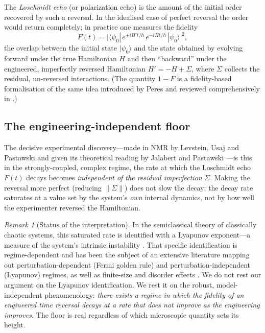 \documentclass[11pt,a4paper]{article}
\theoremstyle{thmstyle}
\theoremstyle{definition}
\theoremstyle{remark}
\newtheorem{remark}[theorem]{Remark}
\begin{document}
The \emph{Loschmidt echo} (or polarization echo) is the amount of the
initial order recovered by such a reversal. In the idealised case of
perfect reversal the order would return completely; in practice one
measures the fidelity
\begin{equation}
F(t) = \bigl|\langle\psi_{0}|\,e^{+i H' t/\hbar}\,e^{-i H t/\hbar}\,
|\psi_{0}\rangle\bigr|^{2},
\label{eq:loschmidt-echo}
\end{equation}
the overlap between the initial state $|\psi_{0}\rangle$ and the state
obtained by evolving forward under the true Hamiltonian $H$ and then
``backward'' under the engineered, imperfectly reversed Hamiltonian $H'=
-H+\Sigma$, where $\Sigma$ collects the residual, un-reversed
interactions. (The quantity $1-F$ is a fidelity-based formalisation of
the same idea introduced by Peres \citep{peres1984} and reviewed
comprehensively in \citep{gorin2006}.)

\subsection{The engineering-independent floor}
\label{sec:eng-independent}

The decisive experimental discovery---made in NMR by Levstein, Usaj and
Pastawski \citep{levstein1998,pastawski2000} and given its theoretical
reading by Jalabert and Pastawski \citep{jalabert2001}---is this: in the
strongly-coupled, complex regime, the rate at which the Loschmidt echo
$F(t)$ decays becomes \emph{independent of the residual imperfection}
$\Sigma$. Making the reversal more perfect (reducing $\|\Sigma\|$) does
not slow the decay; the decay rate saturates at a value set by the
system's \emph{own} internal dynamics, not by how well the experimenter
reversed the Hamiltonian.

\begin{remark}[Status of the interpretation]
\label{rem:lyapunov}
In the semiclassical theory of classically chaotic systems, this
saturated rate is identified with a Lyapunov exponent---a measure of the
system's intrinsic instability \citep{jalabert2001}. That specific
identification is regime-dependent and has been the subject of an
extensive literature mapping out perturbation-dependent (Fermi golden
rule) and perturbation-independent (Lyapunov) regimes, as well as
finite-size and disorder effects \citep{cucchietti2003,gorin2006}. We do
not rest our argument on the Lyapunov identification. We rest it on the
robust, model-independent phenomenology: \emph{there exists a regime in
which the fidelity of an engineered time reversal decays at a rate that
does not improve as the engineering improves.} The floor is real
regardless of which microscopic quantity sets its height.
\end{remark}
\end{document}
